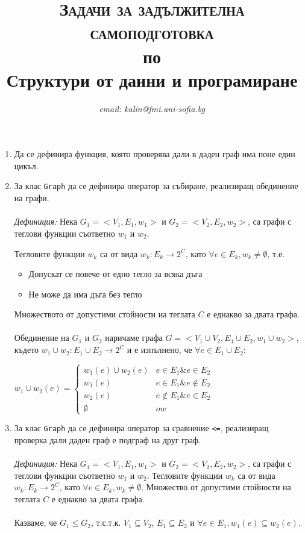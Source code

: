 \documentclass[12pt,a4paper]{article}
\author{\textit{email: kalin@fmi.uni-sofia.bg}}
\title{\textsc{Задачи за задължителна самоподготовка} \\
по \\
Структури от данни и програмиране}
\begin{document}
\maketitle


\begin{enumerate}

	\item Да се дефинира функция, която проверява дали в даден граф има поне един цикъл.

	\item За клас \texttt{Graph} да се дефинира оператор за събиране, реализиращ обединение на графи. 
	\\
	\\
	\textit{Дефиниция:} Нека $G_1=<V_1,E_1,w_1>$ и $G_2 = <V_2,E_2,w_2>$, са графи с теглови функции съответно $w_1$ и $w_2$. 

	Тегловите функции $w_k$ са от вида $w_k:E_k \rightarrow 2^C$, като $\forall e \in E_k, w_k \neq \emptyset$, т.е.
	\begin{itemize}
	 	\item Допускат се повече от едно тегло за всяка дъга
	 	\item Не може да има дъга без тегло
	 \end{itemize}
	 Множеството от допустими стойности на теглата $C$ е еднакво за двата графа. 
	\\
	\\
	Обединение на $G_1$ и $G_2$ наричаме графа $G=<V_1 \cup V_2,E_1 \cup E_2,w_1 \cup w_2>$, където $w_1 \cup w_2 : E_1 \cup E_2 \rightarrow 2^C$ и е изпълнено, че $\forall e \in E_1 \cup E_2$:

$w_1 \cup w_2 (e) = \begin{cases} 
				      w_1(e) \cup w_2(e) & e \in E_1 \& e \in E_2 \\
				      w_1(e) & e \in E_1 \& e \notin E_2  \\
				      w_2(e) & e \notin E_1 \& e \in E_2  \\ 
				      \emptyset & ow
				   \end{cases}$

	\item За клас \texttt{Graph} да се дефинира оператор за сравнение \texttt{<=}, реализиращ проверка дали даден граф е подграф на друг граф. 
	\\
	\\
	\textit{Дефиниция:} Нека $G_1=<V_1,E_1,w_1>$ и $G_2 = <V_2,E_2,w_2>$, са графи с теглови функции съответно $w_1$ и $w_2$. Тегловите функции $w_k$ са от вида $w_k:E_k \rightarrow 2^C$, като $\forall e \in E_k, w_k \neq \emptyset$. Множество от допустими стойности на теглата $C$ е еднакво за двата графа. 
	\\
	\\
	Казваме, че $G_1 \le G_2$, т.с.т.к. $V_1 \subseteq V_2$, $E_1 \subseteq E_2$ и $\forall e \in E_1, w_1(e) \subseteq w_2 (e)$.

\end{enumerate}
\end{document}
